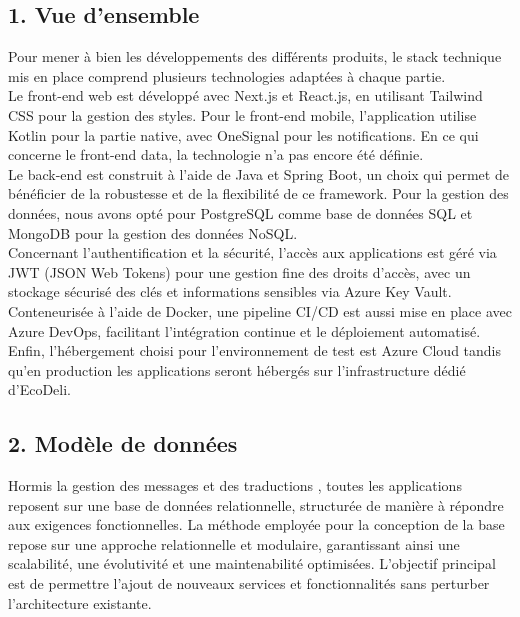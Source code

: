 \documentclass{report}
\begin{document}
\subsection*{1. Vue d’ensemble}
\vspace{0.2cm}
\noindent Pour mener à bien les développements des différents produits, le stack technique mis en place comprend plusieurs technologies adaptées à chaque partie. \\

\noindent Le front-end web est développé avec Next.js et React.js, en utilisant Tailwind CSS pour la gestion des styles. Pour le front-end mobile, l'application utilise Kotlin pour la partie native, avec OneSignal pour les notifications. En ce qui concerne le front-end data, la technologie n'a pas encore été définie. \\

\noindent Le back-end est construit à l'aide de Java et Spring Boot, un choix qui permet de bénéficier de la robustesse et de la flexibilité de ce framework. Pour la gestion des données, nous avons opté pour PostgreSQL comme base de données SQL et MongoDB pour la gestion des données NoSQL. \\

\noindent Concernant l'authentification et la sécurité, l'accès aux applications est géré via JWT (JSON Web Tokens) pour une gestion fine des droits d'accès, avec un stockage sécurisé des clés et informations sensibles via Azure Key Vault. Conteneurisée à l'aide de Docker, une pipeline CI/CD est aussi mise en place avec Azure DevOps, facilitant l'intégration continue et le déploiement automatisé. Enfin, l'hébergement choisi pour l'environnement de test est Azure Cloud tandis qu'en production les applications seront hébergés sur l'infrastructure dédié d'EcoDeli. \\
\vspace{0.5cm}

\subsection*{2. Modèle de données}
\vspace{0.2cm}
\noindent Hormis la gestion des messages et des traductions , toutes les applications reposent sur une base de données relationnelle, structurée de manière à répondre aux exigences fonctionnelles. La méthode employée pour la conception de la base repose sur une approche relationnelle et modulaire, garantissant ainsi une scalabilité, une évolutivité et une maintenabilité optimisées. L’objectif principal est de permettre l’ajout de nouveaux services et fonctionnalités sans perturber l’architecture existante. \\
\end{document}
